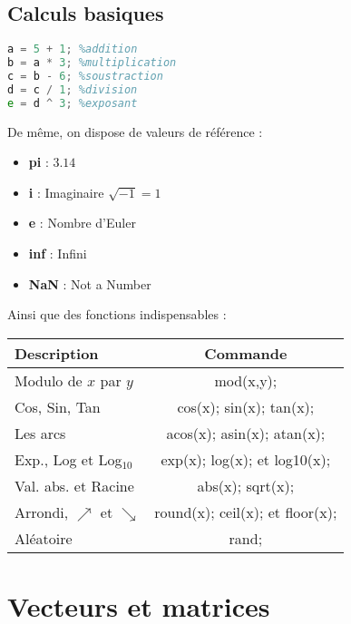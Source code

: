         \subsection{Calculs basiques}
            \begin{lstlisting}[language=Octave]
a = 5 + 1; %addition
b = a * 3; %multiplication
c = b - 6; %soustraction
d = c / 1; %division
e = d ^ 3; %exposant
            \end{lstlisting}
            De même, on dispose de valeurs de référence :
            \begin{itemize}
                \item \textbf{pi} : $3.14$
                \item \textbf{i} : Imaginaire $\sqrt{-1} = 1$
                \item \textbf{e} : Nombre d'Euler
                \item \textbf{inf} : Infini
                \item \textbf{NaN} : Not a Number
            \end{itemize}
            Ainsi que des fonctions indispensables :
            \begin{center}
                \begin{tabular}{| l | c |}
                    \hline
                    Description & Commande \\
                    \hline
                    Modulo de $x$ par $y$ & mod(x,y); \\
                    Cos, Sin, Tan & cos(x); sin(x); tan(x);\\
                    Les arcs & acos(x); asin(x); atan(x); \\
                    Exp., Log et Log$_{10}$ & exp(x); log(x); et log10(x);  \\
                    Val. abs. et Racine & abs(x); sqrt(x);\\
                    Arrondi, $\nearrow$ et $\searrow$ & round(x); ceil(x); et floor(x);\\
                    Aléatoire & rand;\\
                    \hline
                \end{tabular}
            \end{center}
    \section{Vecteurs et matrices}
